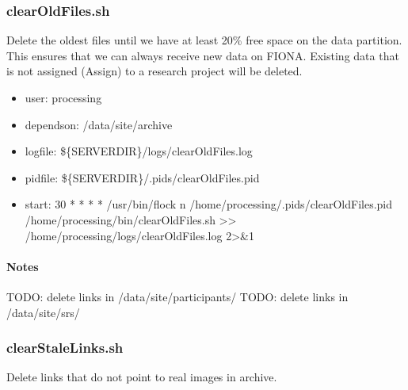 \documentclass[letterpaper,10pt,english]{sphinxmanual}
\begin{document}
\subsubsection{clearOldFiles.sh}
\label{\detokenize{Architecture/scripts/clearOldFiles:clearoldfiles-sh}}\label{\detokenize{Architecture/scripts/clearOldFiles::doc}}
\sphinxAtStartPar
Delete the oldest files until we have at least 20\% free space on the data partition. This ensures that we can always receive new data on FIONA. Existing data that is not assigned (Assign) to a research project will be deleted.
\begin{itemize}
\item {} 
\sphinxAtStartPar
user: processing

\item {} 
\sphinxAtStartPar
depends\sphinxhyphen{}on:
\sphinxhyphen{} /data/site/archive

\item {} 
\sphinxAtStartPar
log\sphinxhyphen{}file:
\sphinxhyphen{} \$\{SERVERDIR\}/logs/clearOldFiles.log

\item {} 
\sphinxAtStartPar
pid\sphinxhyphen{}file: \$\{SERVERDIR\}/.pids/clearOldFiles.pid

\item {} 
\sphinxAtStartPar
start:
30 * * * * /usr/bin/flock \sphinxhyphen{}n /home/processing/.pids/clearOldFiles.pid /home/processing/bin/clearOldFiles.sh \textgreater{}\textgreater{} /home/processing/logs/clearOldFiles.log 2\textgreater{}\&1

\end{itemize}


\paragraph{Notes}
\label{\detokenize{Architecture/scripts/clearOldFiles:notes}}
\sphinxAtStartPar
TODO: delete links in /data/site/participants/
TODO: delete links in /data/site/srs/

\sphinxstepscope


\subsubsection{clearStaleLinks.sh}
\label{\detokenize{Architecture/scripts/clearStaleLinks:clearstalelinks-sh}}\label{\detokenize{Architecture/scripts/clearStaleLinks::doc}}
\sphinxAtStartPar
Delete links that do not point to real images in archive.
\end{document}
